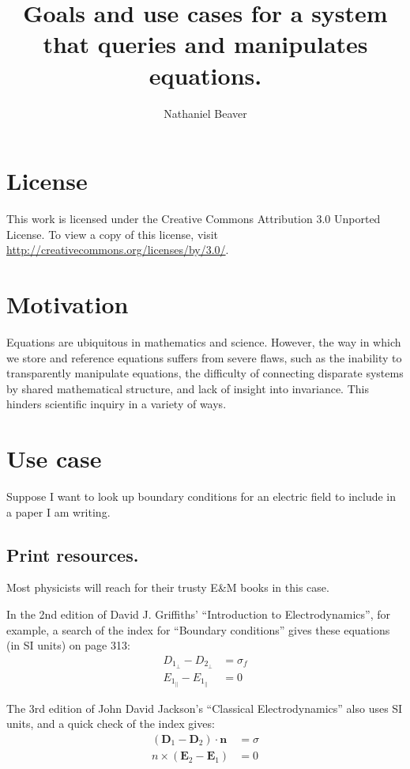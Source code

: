 \documentclass[12pt,letterpaper]{article}
\author{Nathaniel Beaver}
\title{Goals and use cases for a system that queries and manipulates equations.}
\begin{document}
\maketitle

\tableofcontents

\section{License}

This work is licensed under the Creative Commons Attribution 3.0 Unported License.
To view a copy of this license, visit \url{http://creativecommons.org/licenses/by/3.0/}.

\section{Motivation}

Equations are ubiquitous in mathematics and science.
However, the way in which we store and reference equations suffers from severe flaws,
such as the inability to transparently manipulate equations,
the difficulty of connecting disparate systems by shared mathematical structure,
and lack of insight into invariance.
This hinders scientific inquiry in a variety of ways.

\section{Use case}

Suppose I want to look up boundary conditions for an electric field to include in a paper I am writing.

\subsection{Print resources.}

Most physicists will reach for their trusty E\&M books in this case.

In the 2nd edition of David J. Griffiths' ``Introduction to Electrodynamics'', for example,
a search of the index for ``Boundary conditions'' gives these equations (in SI units) on page 313:
\begin{align*}
D_{1_\bot} - D_{2_\bot} &= \sigma_f \\
E_{1_\parallel} - E_{1_\parallel} &= 0
\end{align*}

The 3rd edition of John David Jackson's ``Classical Electrodynamics'' also uses SI units,
and a quick check of the index gives:
\begin{align*}
(\mathbf{D}_1 - \mathbf{D}_2)\cdot \mathbf{n} &= \sigma \\
n \times (\mathbf{E}_2 - \mathbf{E}_1) &= 0
\end{align*}
\end{document}
